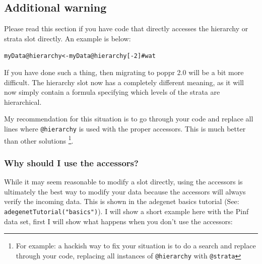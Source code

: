 \documentclass[letterpaper]{article}\usepackage[]{graphicx}\usepackage[]{color}
\makeatletter
\newcommand{\hlnum}[1]{\textcolor[rgb]{0.863,0.196,0.184}{#1}}%
\newcommand{\hlcom}[1]{\textcolor[rgb]{0.576,0.631,0.631}{#1}}%
\newcommand{\hlopt}[1]{\textcolor[rgb]{0.345,0.431,0.459}{#1}}%
\newcommand{\hlstd}[1]{\textcolor[rgb]{0.396,0.482,0.514}{#1}}%
\newcommand{\hlkwb}[1]{\textcolor[rgb]{0.522,0.6,0}{#1}}%
\newcommand{\hlkwc}[1]{\textcolor[rgb]{0.796,0.294,0.086}{#1}}%
\newenvironment{kframe}{%
 \def\at@end@of@kframe{}%
 \ifinner\ifhmode%
  \def\at@end@of@kframe{\end{minipage}}%
  \begin{minipage}{\columnwidth}%
 \fi\fi%
 \def\FrameCommand##1{\hskip\@totalleftmargin \hskip-\fboxsep
 \colorbox{shadecolor}{##1}\hskip-\fboxsep
     \hskip-\linewidth \hskip-\@totalleftmargin \hskip\columnwidth}%
 \MakeFramed {\advance\hsize-\width
   \@totalleftmargin\z@ \linewidth\hsize
   \@setminipage}}%
 {\par\unskip\endMakeFramed%
 \at@end@of@kframe}
\newenvironment{knitrout}{}{} %
\makeatother
\begin{document}
\subsection{Additional warning}

Please read this section if you have code that directly accesses the hierarchy
or strata slot directly. An example is below:

\begin{knitrout}
\color{fgcolor}\begin{kframe}
\begin{alltt}
\hlstd{myData}\hlopt{@}\hlkwc{hierarchy} \hlkwb{<-} \hlstd{myData}\hlopt{@}\hlkwc{hierarchy}\hlstd{[}\hlopt{-}\hlnum{2}\hlstd{]} \hlcom{# wat}
\end{alltt}
\end{kframe}
\end{knitrout}

If you have done such a thing, then migrating to poppr 2.0 will be a bit more 
difficult. The hierarchy slot now has a completely different meaning, as it 
will now simply contain a formula specifying which levels of the strata are
hierarchical. 

My recommendation for this situation is to go through your code and replace all
lines where \texttt{@hierarchy} is used with the proper accessors. This is much
better than other solutions \footnote{For example: a hackish way to fix your
situation is to do a search and replace through your code, replacing all
instances of \texttt{@hierarchy} with \texttt{@strata}}.

\subsubsection{Why should I use the accessors?}

While it may seem reasonable to modify a slot directly, using the accessors is 
ultimately the best way to modify your data because the accessors will always 
verify the incoming data. This is shown in the adegenet basics tutorial (See:
\texttt{adegenetTutorial("basics")}). I will show a short example here with
the Pinf data set, first I will show what happens when you don't use the
accessors:
\end{document}
